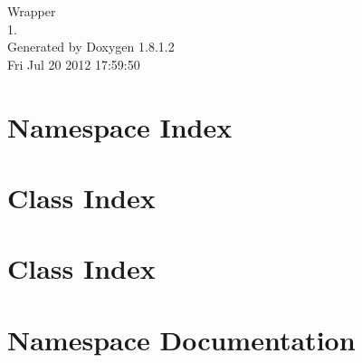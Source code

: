 \documentclass{book}
\begin{document}
\hypersetup{pageanchor=false,citecolor=blue}
\begin{titlepage}
\vspace*{7cm}
\begin{center}
{\Large Wrapper \\[1ex]\large 1. }\\
\vspace*{1cm}
{\large Generated by Doxygen 1.8.1.2}\\
\vspace*{0.5cm}
{\small Fri Jul 20 2012 17:59:50}\\
\end{center}
\end{titlepage}
\clearemptydoublepage
{}
\tableofcontents
\clearemptydoublepage
{}
\hypersetup{pageanchor=true,citecolor=blue}
\chapter{Namespace Index}

\chapter{Class Index}

\chapter{Class Index}

\chapter{Namespace Documentation}

\end{document}
